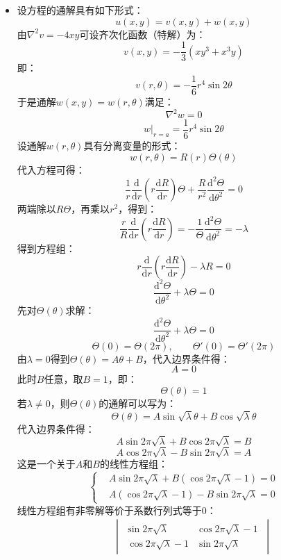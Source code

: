 \documentclass[fontset=windows]{ctexart}
\begin{document}
\begin{itemize}
    \item[4.(3)]
    设方程的通解具有如下形式：
    \[
    u(x,y) = v(x,y) + w(x,y)
    \]
    由$\nabla^2 v = -4xy$可设齐次化函数（特解）为：
    \[
    v(x,y) = -\frac{1}{3}(xy^3 + x^3 y)
    \]
    即：
    \[
    v(r,\theta) = -\frac{1}{6}r^4\sin2\theta
    \]
    于是通解$w(x,y) = w(r,\theta)$满足：
    \[
    \nabla^2 w = 0
    \]
    \[
    \left. w\right|_{r = a} = \frac{1}{6}r^4\sin2\theta
    \]
    设通解$w(r,\theta)$具有分离变量的形式：
    \[
    w(r,\theta) = R(r)\varTheta(\theta)
    \]
    代入方程可得：
    \[
    \frac{1}{r}\frac{\mathrm{d}}{\mathrm{d}r}\left(r\frac{\mathrm{d}R}{\mathrm{d} r}\right)\varTheta + \frac{R}{r^2}\frac{\mathrm{d}^2 \varTheta}{\mathrm{d}\theta^2} = 0
    \]
    两端除以${R\varTheta}$，再乘以$r^2$，得到：
    \[
    \frac{r}{R}\frac{\mathrm{d}}{\mathrm{d}r}\left(r\frac{\mathrm{d}R}{\mathrm{d} r}\right) = -\frac{1}{\varTheta}\frac{\mathrm{d}^2 \varTheta}{\mathrm{d}\theta^2} = -\lambda
    \]
    得到方程组：
    \[
    r\frac{\mathrm{d}}{\mathrm{d}r}\left(r\frac{\mathrm{d}R}{\mathrm{d} r}\right) - \lambda R = 0
    \]
    \[
    \frac{\mathrm{d}^2 \varTheta}{\mathrm{d}\theta^2} + \lambda\varTheta = 0
    \]
    先对$\varTheta(\theta)$求解：
    \[
    \frac{\mathrm{d}^2 \varTheta}{\mathrm{d}\theta^2} + \lambda\varTheta = 0
    \]
    \[
    \varTheta(0) = \varTheta(2\pi),\qquad
    \varTheta'(0) = \varTheta'(2\pi)
    \]
    由$\lambda = 0$得到$\varTheta(\theta) = A\theta + B$，代入边界条件得：
    \[
    A = 0
    \]
    此时$B$任意，取$B = 1$，即：
    \[
    \varTheta(\theta) = 1
    \]
    若$\lambda \neq 0$，则$\varTheta(\theta)$的通解可以写为：
    \[
    \varTheta(\theta) = A\sin\sqrt\lambda\theta + B\cos\sqrt\lambda\theta
    \]
    代入边界条件得：
    \[
    A\sin2\pi\sqrt{\lambda} + B\cos2\pi\sqrt{\lambda} = B
    \]
    \[
    A\cos2\pi\sqrt{\lambda} - B\sin2\pi\sqrt{\lambda} = A
    \]
    这是一个关于$A$和$B$的线性方程组：
    \[
    \left\{
    \begin{aligned}
        & A\sin2\pi\sqrt{\lambda} + B(\cos2\pi\sqrt{\lambda} - 1) = 0 \\
        & A(\cos2\pi\sqrt{\lambda} - 1) - B\sin2\pi\sqrt{\lambda} = 0
    \end{aligned}
    \right.
    \]
    线性方程组有非零解等价于系数行列式等于0：
    \begin{align*}
        &\quad
        \begin{vmatrix}
            \sin2\pi\sqrt{\lambda} & \cos2\pi\sqrt{\lambda} - 1 \ \\
            \ \cos2\pi\sqrt{\lambda} - 1 & \sin2\pi\sqrt{\lambda}

\end{vmatrix}
\end{align*}
\end{itemize}
\end{document}
